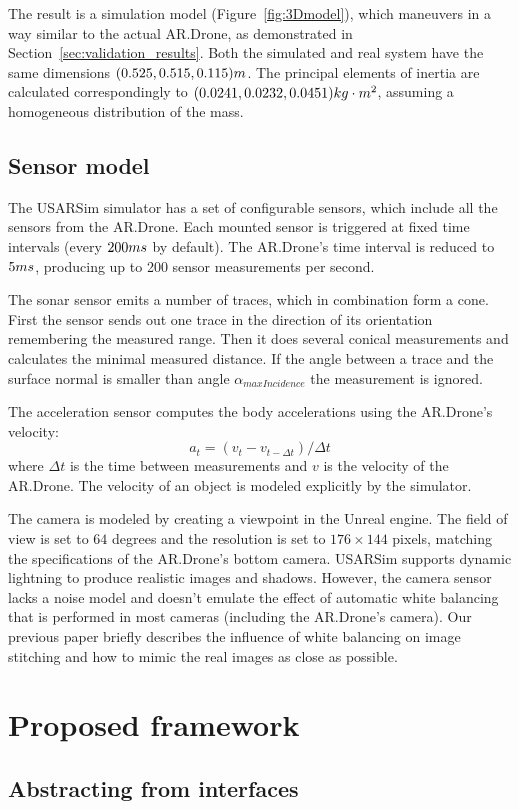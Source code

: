 The result is a simulation model (Figure~\ref{fig:3Dmodel}), which maneuvers in a way similar to the actual AR.Drone, as demonstrated in Section~\ref{sec:validation_results}. Both the simulated and real system have the same dimensions $(0.525,0.515,0.115)\small{m}$. The principal elements of inertia are calculated correspondingly to $(0.0241, 0.0232, 0.0451)\small{kg\cdot m^2}$, assuming a homogeneous distribution of the mass.


		\subsection{Sensor model}
The USARSim simulator has a set of configurable sensors, which include all the sensors from the AR.Drone.
Each mounted sensor is triggered at fixed time intervals (every $200\small{ms}$ by default).
The AR.Drone's time interval is reduced to $5\small{ms}$, producing up to 200 sensor measurements per second.

The sonar sensor emits a number of traces, which in combination form a cone.
First the sensor sends out one trace in the direction of its orientation remembering the measured range.
Then it does several conical measurements and calculates the minimal measured distance.
If the angle between a trace and the surface normal is smaller than angle $\alpha_{maxIncidence}$ the measurement is ignored.

The acceleration sensor computes the body accelerations using the AR.Drone's velocity:
\begin{equation}
a_{t} = (v_{t} - v_{t-\Delta t}) / \Delta t
\end{equation}
where $\Delta t$ is the time between measurements and $v$ is the velocity of the AR.Drone. The velocity of an object is modeled explicitly by the simulator.

The camera is modeled by creating a viewpoint in the Unreal engine.
The field of view is set to $64$ degrees and the resolution is set to $176 \times 144$ pixels, matching the specifications of the AR.Drone's bottom camera.
USARSim supports dynamic lightning to produce realistic images and shadows.
However, the camera sensor lacks a noise model and doesn't emulate the effect of automatic white balancing that is performed in most cameras (including the AR.Drone's camera).
Our previous paper \cite{Visser2011imav} briefly describes the influence of white balancing on image stitching and how to mimic the real images as close as possible.

\section{Proposed framework}
	\subsection{Abstracting from interfaces}